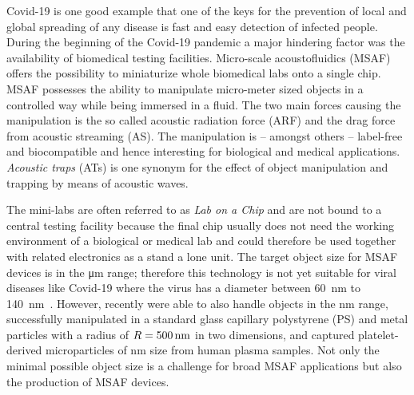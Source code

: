 Covid-19 is one good example that one of the keys for the prevention of local 
and global spreading of any disease is fast and easy detection of infected 
people. During the beginning of the Covid-19 pandemic a major hindering factor 
was the availability of biomedical testing facilities. Micro-scale 
acoustofluidics (MSAF) offers the possibility to miniaturize whole biomedical 
labs onto a single chip. MSAF possesses the ability to manipulate micro-meter 
sized objects in a controlled way while being immersed in a fluid. The two main 
forces causing the manipulation is the so called acoustic radiation force (ARF) 
and the drag force from acoustic streaming (AS). The manipulation is -- amongst 
others -- label-free and biocompatible and hence interesting for biological and 
medical applications. \emph{Acoustic traps} (ATs) is one synonym for the effect 
of object manipulation and trapping by means of acoustic waves.

The mini-labs are often referred to as \emph{Lab on a Chip} and are not bound 
to a central testing facility because the final chip usually does not need the 
working environment of a biological or medical lab and could therefore be used 
together with related electronics as a stand a lone unit. The target object 
size for MSAF devices is in the \si{\um} range; therefore this technology is 
not yet suitable for viral diseases like Covid-19 where the virus has a 
diameter between \SI{60}{\nm} to \SI{140}{\nm}~\cite{Bar-On2020}. However, 
recently  were able to also handle objects in the 
\si{\nano\meter} range,  successfully manipulated in a 
standard glass capillary polystyrene (PS) and metal particles with a radius of 
$\R=\SI{500}{\nm}$ in two dimensions, and  captured 
platelet-derived microparticles of \si{\nm} size from human plasma samples. 
Not only the minimal possible object size is a challenge for broad MSAF 
applications but also the production of MSAF devices.

